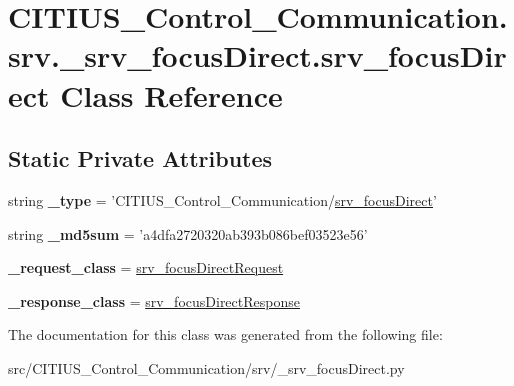 \hypertarget{class_c_i_t_i_u_s___control___communication_1_1srv_1_1__srv__focus_direct_1_1srv__focus_direct}{\section{\-C\-I\-T\-I\-U\-S\-\_\-\-Control\-\_\-\-Communication.\-srv.\-\_\-srv\-\_\-focus\-Direct.\-srv\-\_\-focus\-Direct \-Class \-Reference}
\label{class_c_i_t_i_u_s___control___communication_1_1srv_1_1__srv__focus_direct_1_1srv__focus_direct}
}
\subsection*{\-Static \-Private \-Attributes}
\begin{DoxyCompactItemize}
\item 
\hypertarget{class_c_i_t_i_u_s___control___communication_1_1srv_1_1__srv__focus_direct_1_1srv__focus_direct_a318d8dd1a56d0e7a33a14cc8da537258}{string {\bfseries \-\_\-type} = '\-C\-I\-T\-I\-U\-S\-\_\-\-Control\-\_\-\-Communication/\hyperlink{class_c_i_t_i_u_s___control___communication_1_1srv_1_1__srv__focus_direct_1_1srv__focus_direct}{srv\-\_\-focus\-Direct}'}\label{class_c_i_t_i_u_s___control___communication_1_1srv_1_1__srv__focus_direct_1_1srv__focus_direct_a318d8dd1a56d0e7a33a14cc8da537258}

\item 
\hypertarget{class_c_i_t_i_u_s___control___communication_1_1srv_1_1__srv__focus_direct_1_1srv__focus_direct_a896083f1ea057a98df203188fb9b240c}{string {\bfseries \-\_\-md5sum} = 'a4dfa2720320ab393b086bef03523e56'}\label{class_c_i_t_i_u_s___control___communication_1_1srv_1_1__srv__focus_direct_1_1srv__focus_direct_a896083f1ea057a98df203188fb9b240c}

\item 
\hypertarget{class_c_i_t_i_u_s___control___communication_1_1srv_1_1__srv__focus_direct_1_1srv__focus_direct_a33290528b6d087c7e0e2e72c6a4359b7}{{\bfseries \-\_\-request\-\_\-class} = \hyperlink{class_c_i_t_i_u_s___control___communication_1_1srv_1_1__srv__focus_direct_1_1srv__focus_direct_request}{srv\-\_\-focus\-Direct\-Request}}\label{class_c_i_t_i_u_s___control___communication_1_1srv_1_1__srv__focus_direct_1_1srv__focus_direct_a33290528b6d087c7e0e2e72c6a4359b7}

\item 
\hypertarget{class_c_i_t_i_u_s___control___communication_1_1srv_1_1__srv__focus_direct_1_1srv__focus_direct_a777401b7fd9835b96aee5e125b00aa3f}{{\bfseries \-\_\-response\-\_\-class} = \hyperlink{class_c_i_t_i_u_s___control___communication_1_1srv_1_1__srv__focus_direct_1_1srv__focus_direct_response}{srv\-\_\-focus\-Direct\-Response}}\label{class_c_i_t_i_u_s___control___communication_1_1srv_1_1__srv__focus_direct_1_1srv__focus_direct_a777401b7fd9835b96aee5e125b00aa3f}

\end{DoxyCompactItemize}


\-The documentation for this class was generated from the following file\-:\begin{DoxyCompactItemize}
\item 
src/\-C\-I\-T\-I\-U\-S\-\_\-\-Control\-\_\-\-Communication/srv/\-\_\-srv\-\_\-focus\-Direct.\-py\end{DoxyCompactItemize}
